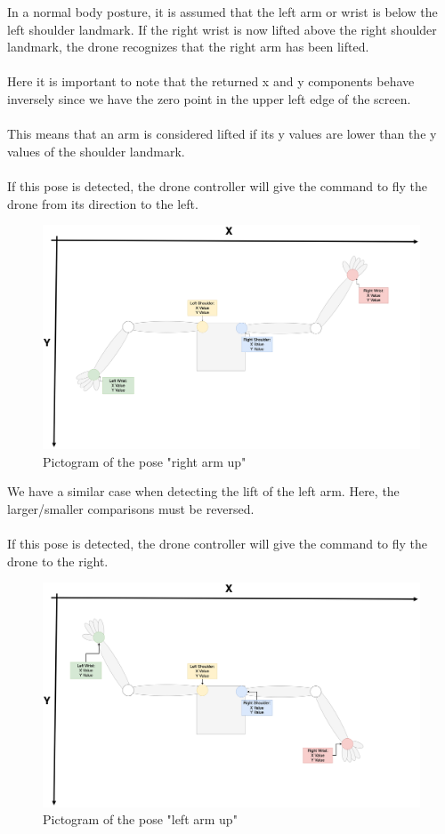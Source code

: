 \documentclass[a4paper,11pt,singlespacing]{article}
\begin{document}
In a normal body posture, it is assumed that the left arm or wrist is below the left shoulder landmark.
If the right wrist is now lifted above the right shoulder landmark, the drone recognizes that the right arm has been lifted.\\\\
Here it is important to note that the returned x and y components behave inversely 
since we have the zero point in the upper left edge of the screen.\\\\
This means that an arm is considered lifted if its y values are lower than the y values of the shoulder landmark.\\\\
If this pose is detected, the drone controller will give the command to fly the drone from its direction to the left.
\begin{figure}[H]
	\centering
	\includegraphics[width=\textwidth]{images/right_arm_up.png}
	\caption{Pictogram of the pose "right arm up"}
	\label{right_arm_up}
\end{figure}
We have a similar case when detecting the lift of the left arm. 
Here, the larger/smaller comparisons must be reversed.\\\\
If this pose is detected, the drone controller will give the command to fly the drone to the right.

\begin{figure}[H]
	\centering
	\includegraphics[width=\textwidth]{images/left_arm_up.png}
	\caption{Pictogram of the pose "left arm up"}
	\label{left_arm_up}
\end{figure}
\end{document}
